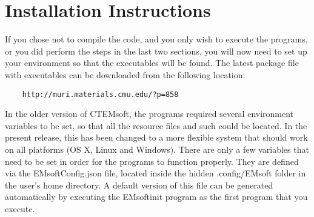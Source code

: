 \documentclass[DIV=calc, paper=letter, fontsize=11pt]{scrartcl}	 %
\begin{document}
\section{Installation Instructions\label{sec:todo}}
If you chose not to compile the code, and you only wish to execute the programs, or you did perform the steps in the last two sections, you will
now need to set up your environment so that the executables will be found.  The latest package file with executables can be downloaded from the following
location:
\begin{verbatim}
	http://muri.materials.cmu.edu/?p=858
\end{verbatim}
In the older version of CTEMsoft, the programs required several environment variables to be set, so
that all the resource files and such could be located. In the present release, this has been changed
to a more flexible system that should work on all platforms (OS X, Linux and Windows).  There are 
only a few variables that need to be set in order for the programs to function properly.  They are defined 
via the \textsf{EMsoftConfig.json} file, located inside the hidden \textsf{.config/EMsoft} folder in the user's 
home directory.  A default version of this file can be generated automatically by executing the \textsf{EMsoftinit} program 
as the first program that you execute.
\end{document}
